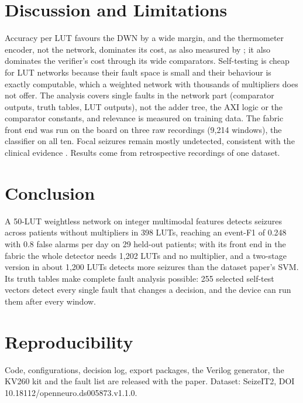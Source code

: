 \documentclass[conference]{IEEEtran}
\begin{document}
\section{Discussion and Limitations}
Accuracy per LUT favours the DWN by a wide margin, and the thermometer encoder, not the network, dominates its cost,
as also measured by \cite{mecik2025thermo}; it also dominates the verifier's cost through its wide comparators.
Self-testing is cheap for LUT networks because their fault space is small and their behaviour is exactly computable,
which a weighted network with thousands of multipliers does not offer. The analysis covers single faults in the
network part (comparator outputs, truth tables, LUT outputs), not the adder tree, the AXI logic or the comparator
constants, and relevance is measured on training data. The fabric front end was run on the board on three raw
recordings (9,214 windows), the classifier on all ten. Focal seizures remain mostly undetected, consistent with the
clinical evidence \cite{beniczky2021guideline}. Results come from retrospective recordings of one dataset.

\section{Conclusion}
A 50-LUT weightless network on integer multimodal features detects seizures across patients without multipliers in
398 LUTs, reaching an event-F1 of 0.248 with 0.8 false alarms per day on 29 held-out patients; with its front end
in the fabric the whole detector needs 1,202 LUTs and no multiplier, and a two-stage
version in about 1,200 LUTs detects more seizures than the dataset paper's SVM. Its truth tables make complete fault
analysis possible: 255 selected self-test vectors detect every single fault that changes a decision, and the device can run them after every window.

\section*{Reproducibility}
Code, configurations, decision log, export packages, the Verilog generator, the KV260 kit and the fault list are
released with the paper. Dataset: SeizeIT2, DOI 10.18112/openneuro.ds005873.v1.1.0.



\end{document}
